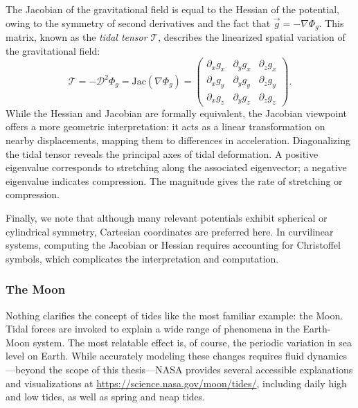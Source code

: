         The Jacobian of the gravitational field is equal to the Hessian of the potential, owing to the symmetry of second derivatives and the fact that \(\vec{g} = -\nabla \Phi_g\). This matrix, known as the \textit{tidal tensor} \(\mathcal{T}\), describes the linearized spatial variation of the gravitational field:
        \begin{equation}
            \mathcal{T} = -\mathcal{D}^2\Phi_g = \mathrm{Jac}(\nabla \Phi_g) = \left(\begin{matrix}
                \partial_x g_x & \partial_y g_x & \partial_z g_x \\
                \partial_x g_y & \partial_y g_y & \partial_z g_y \\
                \partial_x g_z & \partial_y g_z & \partial_z g_z 
            \end{matrix}\right).
        \end{equation}
        While the Hessian and Jacobian are formally equivalent, the Jacobian viewpoint offers a more geometric interpretation: it acts as a linear transformation on nearby displacements, mapping them to differences in acceleration. Diagonalizing the tidal tensor reveals the principal axes of tidal deformation. A positive eigenvalue corresponds to stretching along the associated eigenvector; a negative eigenvalue indicates compression. The magnitude gives the rate of stretching or compression.

        Finally, we note that although many relevant potentials exhibit spherical or cylindrical symmetry, Cartesian coordinates are preferred here. In curvilinear systems, computing the Jacobian or Hessian requires accounting for Christoffel symbols, which complicates the interpretation and computation.
        \subsubsection{The Moon}
            Nothing clarifies the concept of tides like the most familiar example: the Moon. Tidal forces are invoked to explain a wide range of phenomena in the Earth-Moon system. The most relatable effect is, of course, the periodic variation in sea level on Earth. While accurately modeling these changes requires fluid dynamics—beyond the scope of this thesis—NASA provides several accessible explanations and visualizations at \href{https://science.nasa.gov/moon/tides/}{https://science.nasa.gov/moon/tides/}, including daily high and low tides, as well as spring and neap tides.


